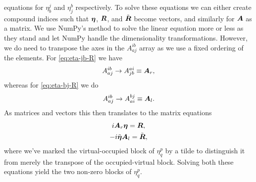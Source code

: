             equations for $\eta^{j}_{b}$ and $\eta^{b}_{j}$ respectively.
            To solve these equations we can either create compound indices such
            that $\boldsymbol{\eta}$, $\boldsymbol{R}$, and $\tilde{\boldsymbol{R}}$ become vectors,
            and similarly for $\boldsymbol{A}$ as a matrix.
            We use NumPy's method  \cite{numpy} to
            solve the linear equation more or less as they stand and let NumPy
            handle the dimensionality transformations.
            However, we do need to transpose the axes in the $A^{ib}_{aj}$
            array as we use a fixed ordering of the elements.
            For \autoref{eq:eta-jb-R} we have
            \begin{align}
                A^{ib}_{aj} \to A^{ai}_{jb} \equiv \boldsymbol{A}_r,
            \end{align}
            whereas for \autoref{eq:eta-bj-R} we do
            \begin{align}
                A^{ib}_{aj} \to A^{bj}_{ai} \equiv \boldsymbol{A}_l.
            \end{align}
            As matrices and vectors this then translates to the matrix equations
            \begin{gather}
                i \boldsymbol{A}_r \boldsymbol{\eta} = \boldsymbol{R},
                \\
                -i\tilde{\boldsymbol{\eta}}\boldsymbol{A}_l = \tilde{\boldsymbol{R}},
            \end{gather}
            where we've marked the virtual-occupied block of $\eta^{p}_{q}$ by a
            tilde to distinguish it from merely the transpose of the
            occupied-virtual block.
            Solving both these equations yield the two non-zero blocks of
            $\eta^{p}_{q}$.

